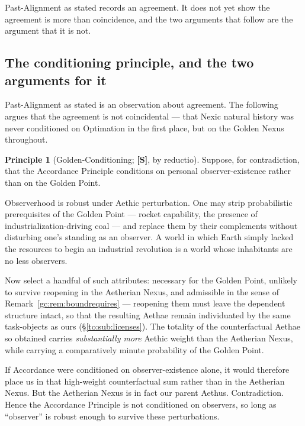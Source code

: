\documentclass[11pt]{article}
\numberwithin{equation}{section}
\theoremstyle{plain}
\theoremstyle{definition}
\newtheorem{principle}{Principle}
\theoremstyle{remark}
\begin{document}
Past-Alignment as stated records an agreement. It does not yet show the
agreement is more than coincidence, and the two arguments that follow are the
argument that it is not.

\subsection{The conditioning principle, and the two arguments for it}\label{gc:sub:conditioning}

Past-Alignment as stated is an observation about agreement. The
following argues that the agreement is not coincidental --- that
Nexic natural history was never conditioned on Optimation in the first
place, but on the Golden Nexus throughout.

\begin{principle}[Golden-Conditioning; \textbf{[S]}, by reductio]
\label{gc:prin:conditioning}
Suppose, for contradiction, that the Accordance Principle conditions on
personal observer-existence rather than on the Golden Point.

Observerhood is robust under Aethic perturbation. One may strip
probabilistic prerequisites of the Golden Point --- rocket capability,
the presence of industrialization-driving coal --- and replace them by
their complements without disturbing one's standing as an observer. A
world in which Earth simply lacked the resources to begin an industrial
revolution is a world whose inhabitants are no less observers.

Now select a handful of such attributes: necessary for the Golden Point,
unlikely to survive reopening in the Aetherian Nexus, and admissible in
the sense of Remark~\ref{gc:rem:boundrequires} --- reopening them must
leave the dependent structure intact, so that the resulting Aethae
remain individuated by the same task-objects as ours
(\S\ref{to:sub:licenses}). The totality of
the counterfactual Aethae so obtained carries \emph{substantially more}
Aethic weight than the Aetherian Nexus, while carrying a comparatively
minute probability of the Golden Point.

If Accordance were conditioned on observer-existence alone, it would
therefore place us in that high-weight counterfactual sum rather than in
the Aetherian Nexus. But the Aetherian Nexus is in fact our parent
Aethus. Contradiction. Hence the Accordance Principle is not conditioned
on observers, so long as ``observer'' is robust enough to survive these
perturbations.
\end{principle}
\end{document}
